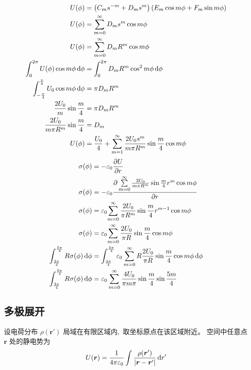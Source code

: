 \begin{align*}
    U(\phi)&=\left(C_ms^{-m}+D_ms^{m}\right)\left(E_m\cos m\phi+F_m\sin m\phi\right)\\
    U(\phi)&=\sum_{m=0}^{\infty}D_ms^{m}\cos m\phi\\
    U(\phi)&=\sum_{m=0}^{\infty}D_mR^{m}\cos m\phi\\
    \int_{0}^{2\pi}U(\phi)\cos m\phi\dif\phi&=\int_{0}^{2\pi}D_mR^{m}\cos^2 m\phi\dif\phi\\
    \int_{-\frac{\pi}{4}}^{\frac{\pi}{4}}U_0\cos m\phi\dif\phi&=\pi D_mR^{m}\\
    \frac{2U_0}{m}\sin \frac{m}{4}&=\pi D_mR^{m}\\
    \frac{2U_0}{m\pi R^{m}}\sin \frac{m}{4}&=D_m\\    
    U(\phi)&=\frac{U_0}{4}+\sum_{m=1}^{\infty}\frac{2U_0s^{m}}{m\pi R^{m}}\sin \frac{m}{4}\cos m\phi
    \end{align*}
    \begin{align*}
    \sigma(\phi)&=-\varepsilon_0\frac{\partial U}{\partial r}\\
    \sigma(\phi)&=-\varepsilon_0\frac{\partial \sum\limits_{m=0}^{\infty}\frac{2U_0}{m\pi R^{m}}\sin \frac{m}{4}r^{m}\cos m\phi}{\partial r}\\
    \sigma(\phi)&=\varepsilon_0{\sum\limits_{m=0}^{\infty}\frac{2U_0}{\pi R^{m}}\sin \frac{m}{4}r^{m-1}\cos m\phi}\\
    \sigma(\phi)&=\varepsilon_0{\sum\limits_{m=0}^{\infty}\frac{2U_0}{\pi R}\sin \frac{m}{4}\cos m\phi}\\
    \int_{\frac{3\pi}{4}}^{\frac{5\pi}{4}}R\sigma(\phi)\dif\phi&=\int_{\frac{3\pi}{4}}^{\frac{5\pi}{4}}\varepsilon_0\sum\limits_{m=0}^{\infty}R\frac{2U_0}{\pi R}\sin \frac{m}{4}\cos m\phi\dif\phi\\
    \int_{\frac{3\pi}{4}}^{\frac{5\pi}{4}}R\sigma(\phi)\dif\phi&=\varepsilon_0\sum\limits_{m=0}^{\infty}\frac{4U_0}{\pi m\pi}\sin\frac{m}{4}\sin\frac{5m}{4}
\end{align*}
\subsection{多极展开}

设电荷分布 $\rho(\boldsymbol r')$ 局域在有限区域内, \,取坐标原点在该区域附近。
空间中任意点 $\boldsymbol r$ 处的静电势为
\begin{equation}
U(\boldsymbol r)
=
\frac{1}{4\pi\varepsilon_0}
\int
\frac{\rho(\boldsymbol r')}{|\boldsymbol r-\boldsymbol r'|}
\dif r'
\end{equation}

